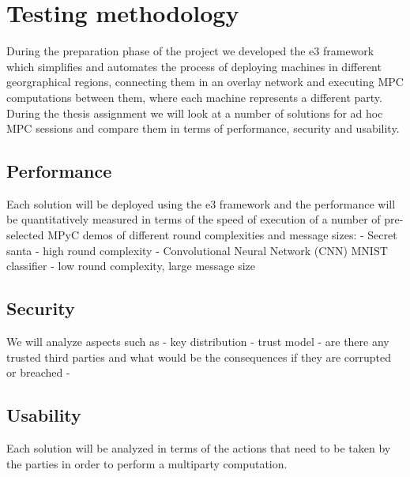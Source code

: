 \hypertarget{testing-methodology}{%
\chapter{Testing methodology}\label{testing-methodology}}

During the preparation phase of the project we developed the \gls{e3}
framework which simplifies and automates the process of deploying
machines in different georgraphical regions, connecting them in an
overlay network and executing MPC computations between them, where each
machine represents a different party. During the thesis assignment we
will look at a number of solutions for ad hoc MPC sessions and compare
them in terms of performance, security and usability.

\hypertarget{performance}{%
\section{Performance}\label{performance}}

Each solution will be deployed using the \gls{e3} framework and the
performance will be quantitatively measured in terms of the speed of
execution of a number of pre-selected MPyC demos of different round
complexities and message sizes: - Secret santa - high round complexity -
Convolutional Neural Network (CNN) MNIST classifier - low round
complexity, large message size

\hypertarget{security}{%
\section{Security}\label{security}}

We will analyze aspects such as - key distribution - trust model - are
there any trusted third parties and what would be the consequences if
they are corrupted or breached -

\hypertarget{usability}{%
\section{Usability}\label{usability}}

Each solution will be analyzed in terms of the actions that need to be
taken by the parties in order to perform a multiparty computation.
